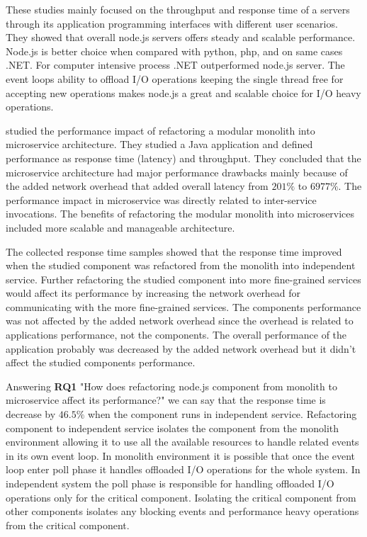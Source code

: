 These studies mainly focused on the throughput and response time of a servers through its application programming interfaces with different user scenarios.
They showed that overall node.js servers offers steady and scalable performance.
Node.js is better choice when compared with python, php, and on same cases .NET.
For computer intensive process .NET outperformed node.js server.
The event loops ability to offload I/O operations keeping the single thread free for accepting new operations makes node.js a great and scalable choice for I/O heavy operations.

\cite{SelakovicPerformanceIssues} studied the performance impact of refactoring a modular monolith into microservice architecture.
They studied a Java application and defined performance as response time (latency) and throughput.
They concluded that the microservice architecture had major performance drawbacks mainly because of the added network overhead that added overall latency from $201\%$ to $6977\%$.
The performance impact in microservice was directly related to inter-service invocations.
The benefits of refactoring the modular monolith into microservices included more scalable and manageable architecture.

The collected response time samples showed that the response time improved when the studied component was refactored from the monolith into independent service.
Further refactoring the studied component into more fine-grained services would affect its performance by increasing the network overhead for communicating with the more fine-grained services.
The components performance was not affected by the added network overhead since the overhead is related to applications performance, not the components.
The overall performance of the application probably was decreased by the added network overhead but it didn't affect the studied components performance.

Answering \textbf{RQ1} "How does refactoring node.js component from monolith to microservice affect its performance?" we can say that the response time is decrease by $46.5\%$ when the component runs in independent service.
Refactoring component to independent service isolates the component from the monolith environment allowing it to use all the available resources to handle related events in its own event loop.
In monolith environment it is possible that once the event loop enter poll phase it handles offloaded I/O operations for the whole system.
In independent system the poll phase is responsible for handling offloaded I/O operations only for the critical component.
Isolating the critical component from other components isolates any blocking events and performance heavy operations from the critical component.

